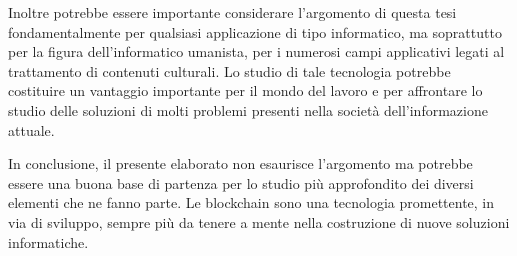 Inoltre potrebbe essere importante considerare l'argomento di questa tesi fondamentalmente per qualsiasi applicazione di tipo informatico, ma soprattutto per la figura dell'informatico umanista, per i numerosi campi applicativi legati al trattamento di contenuti culturali. Lo studio di tale tecnologia potrebbe costituire un vantaggio importante per il mondo del lavoro e per affrontare lo studio delle soluzioni di molti problemi presenti nella società dell’informazione attuale.

In conclusione, il presente elaborato non esaurisce l’argomento ma potrebbe essere una buona base di partenza per lo studio più approfondito dei diversi elementi che ne fanno parte. Le blockchain sono una tecnologia promettente, in via di sviluppo, sempre più da tenere a mente nella costruzione di nuove soluzioni informatiche.